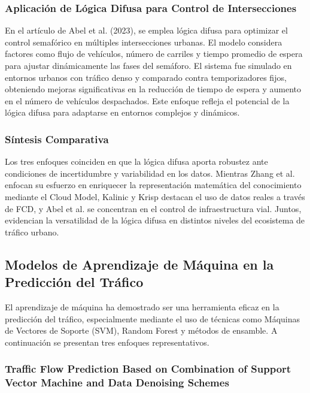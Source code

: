 \documentclass{svproc} %
\begin{document}
\subsubsection{Aplicación de Lógica Difusa para Control de Intersecciones}

En el artículo de Abel et al. (2023), se emplea lógica difusa para optimizar el control semafórico en múltiples intersecciones urbanas. El modelo considera factores como flujo de vehículos, número de carriles y tiempo promedio de espera para ajustar dinámicamente las fases del semáforo. El sistema fue simulado en entornos urbanos con tráfico denso y comparado contra temporizadores fijos, obteniendo mejoras significativas en la reducción de tiempo de espera y aumento en el número de vehículos despachados. Este enfoque refleja el potencial de la lógica difusa para adaptarse en entornos complejos y dinámicos.

\subsubsection{Síntesis Comparativa}

Los tres enfoques coinciden en que la lógica difusa aporta robustez ante condiciones de incertidumbre y variabilidad en los datos. Mientras Zhang et al. enfocan su esfuerzo en enriquecer la representación mate\-mática del conocimiento mediante el Cloud Model, Kalinic y Krisp destacan el uso de datos reales a través de FCD, y Abel et al. se concentran en el control de infraestructura vial. Juntos, evidencian la versatilidad de la lógica difusa en distintos niveles del ecosistema de tráfico urbano.

\subsection{Modelos de Aprendizaje de Máquina en la Predicción del Tráfico}

El aprendizaje de máquina ha demostrado ser una herramienta eficaz en la predicción del tráfico, especialmente mediante el uso de técnicas como Máquinas de Vectores de Soporte (SVM), Random Forest y métodos de ensamble. A continuación se presentan tres enfoques representativos.

\subsubsection{Traffic Flow Prediction Based on Combination of Support Vector Machine and Data Denoising Schemes}
\end{document}
